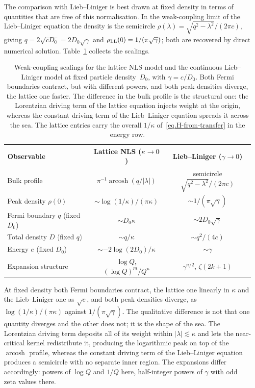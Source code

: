 \documentclass[11pt,a4paper]{article}
\theoremstyle{definition}
\begin{document}
The comparison with Lieb--Liniger is best drawn at fixed density in terms of
quantities that are free of this normalisation.  In the weak-coupling limit of
the Lieb--Liniger equation the density is the semicircle
$\rho(\lambda) = \sqrt{q^2-\lambda^2}/(2\pi c)$, giving
$q = 2\sqrt{cD_0} = 2D_0\sqrt{\gamma}$ and
$\rho_{\rm LL}(0) = 1/(\pi\sqrt{\gamma})$; both are recovered by direct
numerical solution.  Table~\ref{tab:comparison} collects the scalings.

\begin{table}[htbp]
\centering
\begin{tabular}{l c c}
\hline\hline
Observable & Lattice NLS ($\kappa \to 0$) & Lieb--Liniger ($\gamma \to 0$) \\
\hline
Bulk profile & $\pi^{-1}\operatorname{arcosh}(q/|\lambda|)$ & semicircle $\sqrt{q^2-\lambda^2}/(2\pi c)$ \\[3pt]
Peak density $\rho(0)$ & $\sim \log(1/\kappa)/(\pi\kappa)$ & $\sim 1/(\pi\sqrt{\gamma})$ \\[3pt]
Fermi boundary $q$ (fixed $D_0$) & $\sim D_0\kappa$ & $\sim 2D_0\sqrt{\gamma}$ \\[3pt]
Total density $D$ (fixed $q$) & $\sim q/\kappa$ & $\sim q^2/(4c)$ \\[3pt]
Energy $e$ (fixed $D_0$) & $\sim -2\log(2D_0)/\kappa$ & $\sim \gamma$ \\[3pt]
Expansion structure & $\log Q$, $(\log Q)^m/Q^n$ & $\gamma^{n/2}$, $\zeta(2k+1)$ \\
\hline\hline
\end{tabular}
\caption{Weak-coupling scalings for the lattice NLS model and the continuous
Lieb--Liniger model at fixed particle density~$D_0$, with $\gamma = c/D_0$.
Both Fermi boundaries contract, but with different powers, and both peak
densities diverge, the lattice one faster.  The difference in the bulk profile
is the structural one: the Lorentzian driving term of the lattice equation
injects weight at the origin, whereas the constant driving term of the
Lieb--Liniger equation spreads it across the sea.  The lattice entries carry the
overall $1/\kappa$ of~\eqref{eq.H-from-transfer} in the energy row.}
\label{tab:comparison}
\end{table}

At fixed density both Fermi boundaries contract, the lattice one linearly in
$\kappa$ and the Lieb--Liniger one as $\sqrt{c}$, and both peak densities
diverge, as $\log(1/\kappa)/(\pi\kappa)$ against $1/(\pi\sqrt{\gamma})$.  The
qualitative difference is not that one quantity diverges and the other does not;
it is the shape of the sea.  The Lorentzian driving term deposits all of its
weight within $|\lambda| \lesssim \kappa$ and lets the near-critical kernel
redistribute it, producing the logarithmic peak on top of the
$\operatorname{arcosh}$ profile, whereas the constant driving term of the
Lieb--Liniger equation produces a semicircle with no separate inner region.  The
expansions differ accordingly: powers of $\log Q$ and $1/Q$ here, half-integer
powers of $\gamma$ with odd zeta values there.
\end{document}
